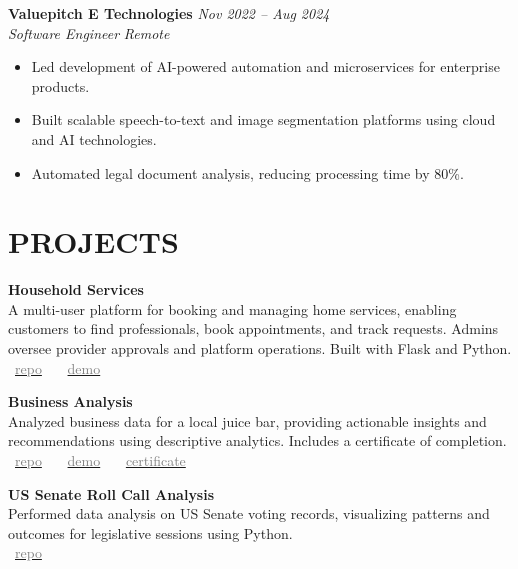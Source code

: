 \documentclass[11pt,a4paper]{article}
\begin{document}
\textbf{Valuepitch E Technologies} \hfill \textit{Nov 2022 -- Aug 2024} \\
\textit{Software Engineer} \hfill \textit{Remote} \\
\begin{itemize}[leftmargin=*]
    \item Led development of AI-powered automation and microservices for enterprise products.
    \item Built scalable speech-to-text and image segmentation platforms using cloud and AI technologies.
    \item Automated legal document analysis, reducing processing time by 80\%.
\end{itemize}

\section*{PROJECTS}

\textbf{Household Services} \\
A multi-user platform for booking and managing home services, enabling customers to find professionals, book appointments, and track requests. Admins oversee provider approvals and platform operations. Built with Flask and Python. \\
\faGithub~\href{https://github.com/21f1006194/Household-Services}{\textcolor{gray}{repo}} \, \textbar{} \,
\faPlayCircle~\href{https://www.youtube.com/watch?v=FHMdtaLWznI}{\textcolor{gray}{demo}} 

\textbf{Business Analysis} \\
Analyzed business data for a local juice bar, providing actionable insights and recommendations using descriptive analytics. Includes a certificate of completion. \\
\faGithub~\href{https://github.com/jishnujp/avocado-analysis}{\textcolor{gray}{repo}} \, \textbar{} \,
\faPlayCircle~\href{https://www.youtube.com/watch?v=u5RuEhBsXKg}{\textcolor{gray}{demo}} \, \textbar{} \,
\faFilePdfO~\href{https://raw.githubusercontent.com/jishnujp/avocado-analysis/main/public/certificate.pdf}{\textcolor{gray}{certificate}} 

\textbf{US Senate Roll Call Analysis} \\
Performed data analysis on US Senate voting records, visualizing patterns and outcomes for legislative sessions using Python. \\
\faGithub~\href{https://github.com/jishnujp/US_senate_roll_call}{\textcolor{gray}{repo}} 
\end{document}
